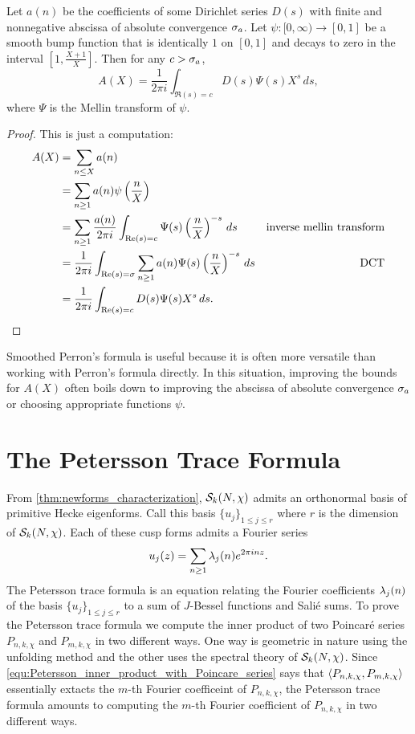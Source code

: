       \begin{theorem}\label{thm:Perron's_formula_with_test_function
      }
        Let $a(n)$ be the coefficients of some Dirichlet series $D(s)$ with finite and nonnegative abscissa of absolute convergence $\sigma_{a}$. Let $\psi:[0,\infty) \to [0,1]$ be a smooth bump function that is identically $1$ on $[0,1]$ and decays to zero in the interval $\left[1,\frac{X+1}{X}\right]$. Then for any $c > \sigma_{a}$,
        \[
          A(X) = \frac{1}{2\pi i}\int_{\Re(s) = c}D(s)\Psi(s)X^{s}\,ds,
        \]
        where $\Psi$ is the Mellin transform of $\psi$.
      \end{theorem}
      \begin{proof}
        This is just a computation:
        \begin{align*}
          A(X) &= \sum_{n \le X}a(n) \\
          &= \sum_{n \ge 1}a(n)\psi\left(\frac{n}{X}\right) \\
          &= \sum_{n \ge 1}\frac{a(n)}{2\pi i}\int_{\mathrm{Re}(s) = c}\Psi(s)\left(\frac{n}{X}\right)^{-s}\,ds & \text{inverse mellin transform} \\
          &= \frac{1}{2\pi i}\int_{\mathrm{Re}(s) = \sigma}\sum_{n \ge 1}a(n)\Psi(s)\left(\frac{n}{X}\right)^{-s}\,ds & \text{DCT} \\
          &= \frac{1}{2\pi i}\int_{\mathrm{Re}(s) = c}D(s)\Psi(s)X^{s}\,ds. \\
      \end{align*}
      \end{proof}

      Smoothed Perron's formula is useful because it is often more versatile than working with Perron's formula directly. In this situation, improving the bounds for $A(X)$ often boils down to improving the abscissa of absolute convergence $\sigma_{a}$ or choosing appropriate functions $\psi$.
    \section{The Petersson Trace Formula}
      From \cref{thm:newforms_characterization}, $\mathcal{S}_{k}(N,\chi)$ admits an orthonormal basis of primitive Hecke eigenforms. Call this basis $\{u_{j}\}_{1 \le j \le r}$ where $r$ is the dimension of $\mathcal{S}_{k}(N,\chi)$. Each of these cusp forms admits a Fourier series
      \[
        u_{j}(z) = \sum_{n \ge 1}\lambda_{j}(n)e^{2\pi inz}.
      \]
      The Petersson trace formula is an equation relating the Fourier coefficients $\lambda_{j}(n)$ of the basis $\{u_{j}\}_{1 \le j \le r}$ to a sum of $J$-Bessel functions and Sali\'e sums. To prove the Petersson trace formula we compute the inner product of two Poincar\'e series $P_{n,k,\chi}$ and $P_{m,k,\chi}$ in two different ways. One way is geometric in nature using the unfolding method and the other uses the spectral theory of $\mathcal{S}_{k}(N,\chi)$. Since \cref{equ:Petersson_inner_product_with_Poincare_series} says that $\langle P_{n,k,\chi},P_{m,k,\chi}\rangle$ essentially extacts the $m$-th Fourier coefficeint of $P_{n,k,\chi}$, the Petersson trace formula amounts to computing the $m$-th Fourier coefficient of $P_{n,k,\chi}$ in two different ways.


